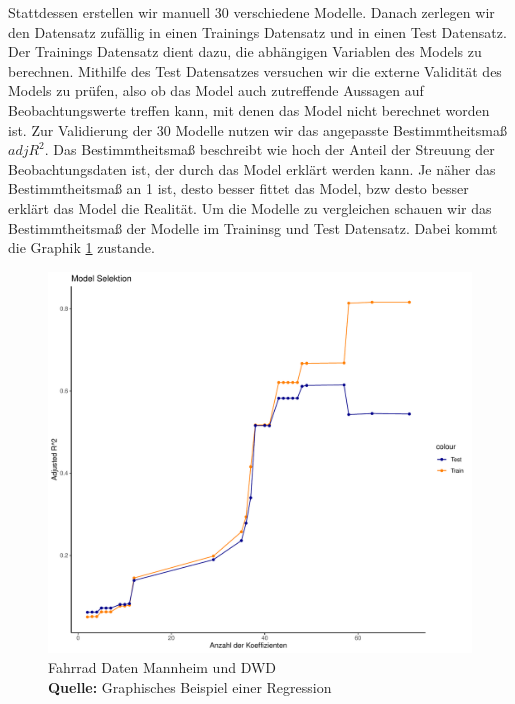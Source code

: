 \documentclass[a4paper,12pt]{thesis}
\newcommand*{\captionsource}[2]{%
	\caption[{#1}]{%
		#1%
		\\\hspace{\linewidth}%
		\textbf{Quelle:} #2%
	}%
}
\begin{document}
Stattdessen erstellen wir manuell 30 verschiedene Modelle. Danach zerlegen wir den Datensatz zufällig in einen Trainings Datensatz und in einen Test Datensatz. Der Trainings Datensatz dient dazu, die abhängigen Variablen des Models zu berechnen. Mithilfe des Test Datensatzes versuchen wir die externe Validität des Models zu prüfen, also ob das Model auch zutreffende Aussagen auf Beobachtungswerte treffen kann, mit denen das Model nicht berechnet worden ist. Zur Validierung der 30 Modelle nutzen wir das angepasste Bestimmtheitsmaß $adj R^2$. Das Bestimmtheitsmaß beschreibt wie hoch der Anteil der Streuung der Beobachtungsdaten ist, der durch das Model erklärt werden kann. Je näher das Bestimmtheitsmaß an 1 ist, desto besser fittet das Model, bzw desto besser erklärt das Model die Realität. Um die Modelle zu vergleichen schauen wir das Bestimmtheitsmaß der Modelle im Traininsg und Test Datensatz. Dabei kommt die Graphik \ref{ModelSelektion} zustande.

\begin{figure}[]
	\centering
	\includegraphics[width=\textwidth]{Plots/ModelSelektion1.pdf}
	\captionsource{Fahrrad Daten Mannheim und DWD}{
		Graphisches Beispiel einer Regression
	}
	\label{ModelSelektion}
\end{figure}
\end{document}
